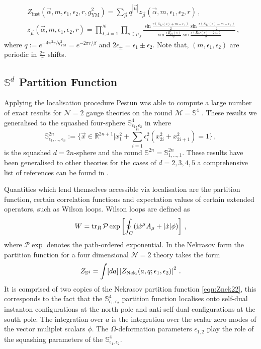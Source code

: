 \documentclass[main.tex]{subfiles}
\begin{document}
\begin{align}\label{eqn:intro5dinsts}
&Z_{\text{inst}}\left(\vec{\alpha},m,\epsilon_1,\epsilon_2,r,g^2_{\text{YM}}\right)=\sum_{\vec{\mu}} q^{|\vec{\mu}|}z_{\vec{\mu}}\left(\vec{\alpha},m,\epsilon_1,\epsilon_2,r\right)\,,\\
&z_{\vec{\mu}}\left(\vec{\alpha},m,\epsilon_1,\epsilon_2,r\right)=\prod_{I,J=1}^N\prod_{s\in\mu_J}\frac{\sin\frac{r\left(E_{IJ}(s)+m-\epsilon_+\right)}{2}\sin\frac{r\left(E_{IJ}(s)-m-\epsilon_+\right)}{2}}{\sin\frac{rE_{IJ}(s)}{2}\sin\frac{r\left(E_{IJ}(s)-2\epsilon_+\right)}{2}}\,,
\end{align}
where $q:=e^{-4\pi^2r/g^2_{\text{YM}}}=e^{-2\pi r/\beta}$ and $2\epsilon_{\pm}=\epsilon_1\pm\epsilon_2$.  Note that, $(m,\epsilon_1,\epsilon_2)$ are periodic in $\frac{2\pi}{r}$ shifts.

\subsection{\texorpdfstring{$\mathbb{S}^d$}{Sd} Partition Function}
Applying the localisation procedure Pestun was able to compute a large number of exact results for $\mathcal{N}=2$ gauge theories on the round $\mathcal{M}=\mathbb{S}^4$ \cite{Pestun:2007rz}.  These results we generalised to the squashed four-sphere $\mathbb{S}^4_{\epsilon_1,\epsilon_2}$ in \cite{Hama:2012bg} where 
\begin{equation}
\mathbb{S}^{2n}_{\epsilon_1,\dots,\epsilon_n}:=\{\vec{x}\in\mathbb{R}^{2n+1}|x_1^2+\sum_{i=1}^n\epsilon_i^2(x_{2i}^2+x_{2i+1}^2)=1\}\,,
\end{equation}
is the squashed $d=2n$-sphere and the round $\mathbb{S}^{2n}=\mathbb{S}^{2n}_{1,\dots,1}$.  These results have been generalised to other theories for the cases of $d=2,3,4,5$ a comprehensive list of references can be found in \cite{Pestun:2016zxk}.

Quantities which lend themselves accessible via localisation are the partition function, certain correlation functions and expectation values of certain extended operators, such as Wilson loops.  Wilson loops are defined as 
\begin{equation}
W=\operatorname{tr}_{R}\mathcal{P}\exp\left[\oint_{C}(\mathrm{i}\dot x^{\mu}A_{\mu}+|\dot x|\phi)\right]\,,
\end{equation}  
where $\mathcal{P}\exp$ denotes the path-ordered exponential. In the Nekrasov form the partition function for a four dimensional $\mathcal{N}=2$ theory takes the form \cite{Pestun2016}
\begin{equation}\label{eqn:introS4part}
Z_{\mathbb{S}^4}=\int [d a]\left|Z_{\text{Nek.}}(a,q;\epsilon_1,\epsilon_2)\right|^2\,.
\end{equation} 
It is comprised of two copies of the Nekrasov partition function \eqref{eqn:Znek22}, this corresponds to the fact that the $\mathbb{S}^4_{\epsilon_1,\epsilon_2}$ partition function localises onto self-dual instanton configurations at the north pole and anti-self-dual configurations at the south pole.  The integration over $a$ is the integration over the scalar zero modes of the vector muliplet scalars $\phi$.  The $\Omega$-deformation parameters $\epsilon_{1,2}$ play the role of the squashing parameters of the $\mathbb{S}^4_{\epsilon_1,\epsilon_2}$.
\end{document}
